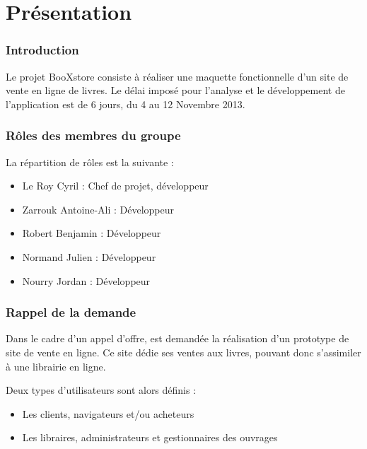 \part{Présentation}
\section{Introduction}

	Le projet BooXstore consiste à réaliser une maquette fonctionnelle d'un site de vente en ligne de livres. Le délai imposé pour l'analyse et le développement de l'application est de 6 jours, du 4 au 12 Novembre 2013.

\section{Rôles des membres du groupe}

	La répartition de rôles est la suivante :
	\begin{itemize}
		\item Le Roy Cyril : Chef de projet, développeur
		\item Zarrouk Antoine-Ali : Développeur
		\item Robert Benjamin : Développeur
		\item Normand Julien : Développeur
		\item Nourry Jordan : Développeur
	\end{itemize}

\section{Rappel de la demande}

	Dans le cadre d'un appel d'offre, est demandée la réalisation d'un prototype de site de vente en ligne. Ce site dédie ses ventes aux livres, pouvant donc s'assimiler à une librairie en ligne.

	Deux types d'utilisateurs sont alors définis :
	\begin{itemize}
		\item Les clients, navigateurs et/ou acheteurs
		\item Les libraires, administrateurs et gestionnaires des ouvrages
	\end{itemize}
